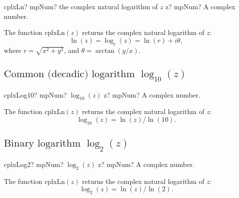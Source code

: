 \begin{mpFunctionsExtract}
	\mpFunctionOne
	{cplxLn? mpNum? the complex natural logarithm of $z$}
	{z? mpNum? A complex number.}
\end{mpFunctionsExtract}

\vspace{0.3cm}
The function \textsf{cplxLn$(z)$} returns the complex natural logarithm of $z$: 
\begin{equation}
	\ln(z)= \log_e(z) = \ln(r) + i \theta,
\end{equation}
where $r=\sqrt{x^2+y^2}$, and $\theta=\arctan(y/x)$.







\subsection{\texorpdfstring{$\text{Common (decadic) logarithm }\log_{10}(z)$}{log10}}

\begin{mpFunctionsExtract}
	\mpFunctionOne
	{cplxLog10? mpNum? $\log_{10}(z)$}
	{z? mpNum? A complex number.}
\end{mpFunctionsExtract}

\vspace{0.3cm}
The function \textsf{cplxLn$(z)$} returns the complex natural logarithm of $z$: 
\begin{equation}
	\log_{10}(z) =  \ln(z)/\ln(10).
\end{equation}





\subsection{\texorpdfstring{$\text{Binary logarithm }\log_2(z)$}{log2}}

\begin{mpFunctionsExtract}
	\mpFunctionOne
	{cplxLog2? mpNum? $\log_{2}(z)$}
	{z? mpNum? A complex number.}
\end{mpFunctionsExtract}

\vspace{0.3cm}
The function \textsf{cplxLn$(z)$} returns the complex natural logarithm of $z$: 
\begin{equation}
	\log_{2}(z) =  \ln(z)/\ln(2).
\end{equation}







